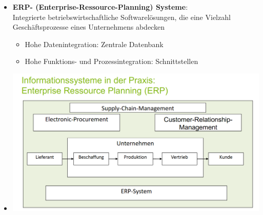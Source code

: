 \documentclass[12pt,a4paper]{article}
\begin{document}
\begin{itemize}
   \item \textbf{ERP- (Enterprise-Ressource-Planning) Systeme}:\\
         Integrierte betriebswirtschaftliche Softwarelösungen, die eine Vielzahl Geschäftsprozesse eines Unternehmens abdecken
      \begin{itemize}
			\item Hohe Datenintegration: Zentrale Datenbank
			\item Hohe Funktions- und Prozessintegration: Schnittstellen
      \end{itemize}
   \item[] \includegraphics[scale=0.35]{digi_pic.png}
\end{itemize}


\vspace{0.5cm}
\end{document}
